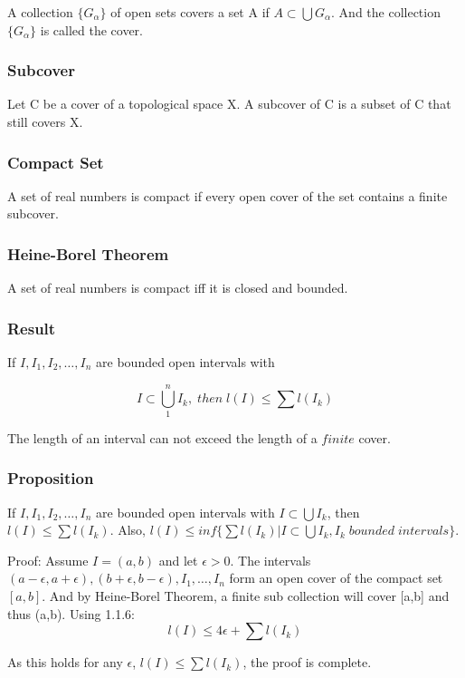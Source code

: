 \documentclass{article}
\begin{document}
 A collection $\{G_{\alpha}\}$ of open sets covers a set A if $A \subset \bigcup G_{\alpha}$. And the collection $\{G_{\alpha}\}$ is called the cover.
 
 \subsubsection{Subcover}
 
 Let C be a cover of a topological space X. A subcover of C is a subset of C that still covers X.
 
 \subsubsection{Compact Set}
 
A set of real numbers is compact if every open cover of the set contains a finite subcover.

\subsubsection{Heine-Borel Theorem}
A set of real numbers is compact iff it is closed and bounded.

\subsubsection{Result}
If $I,I_1,I_2,\dots ,I_n$ are bounded open intervals with 

$$ I \subset \bigcup_{1}^{n}I_k ,\; then  \;l(I) \leq \sum l(I_k)$$

The length of an interval can not exceed the length of a $finite$ cover.

\subsubsection{Proposition}

If $I,I_1,I_2,\dots ,I_n$ are bounded open intervals with $ I \subset \bigcup I_k$, then $l(I) \leq \sum l(I_k)$. Also, $ l(I) \leq inf\{ \sum l(I_k) | I \subset \bigcup I_k, I_k \; bounded \; intervals \}$.

Proof: Assume $I =(a,b)$ and let $\epsilon > 0$. The intervals $(a-\epsilon,a+\epsilon),(b+\epsilon,b-\epsilon),I_1,\dots ,I_n$ form an open cover of the compact set $[a,b]$. And by Heine-Borel Theorem, a finite sub collection will cover [a,b] and thus (a,b).
Using 1.1.6:
$$  l(I) \leq 4\epsilon +  \sum l(I_k)$$

As this holds for any $\epsilon$, $l(I) \leq \sum l(I_k)$, the proof is complete.
\end{document}
